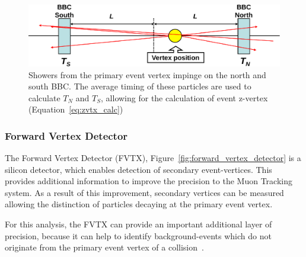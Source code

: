 \begin{figure}[ht]
  \centering
  \includegraphics[width=\linewidth]{./figures/bbc_vertex_reconstruction.pdf}
  \caption{
    Showers from the primary event vertex impinge on the north and south BBC.
    The average timing of these particles are used to calculate $T_N$ and $T_S$,
    allowing for the calculation of event z-vertex (Equation~\ref{eq:zvtx_calc})
  }
  \label{fig:bbc_vertex_reconstruction}
\end{figure}

\clearpage
\subsubsection{Forward Vertex Detector}
\label{sec:forward_vertex_detector}

The Forward Vertex Detector (FVTX), Figure~\ref{fig:forward_vertex_detector} is
a silicon detector, which enables detection of secondary event-vertices.  This
provides additional information to improve the precision to the Muon Tracking
system. As a result of this improvement, secondary vertices can be measured
allowing the distinction of particles decaying at the primary event vertex. 

For this analysis, the FVTX can provide an important additional layer of
precision, because it can help to identify background-events which do not
originate from the primary event vertex of a collision~\cite{Aidala2014}.  

